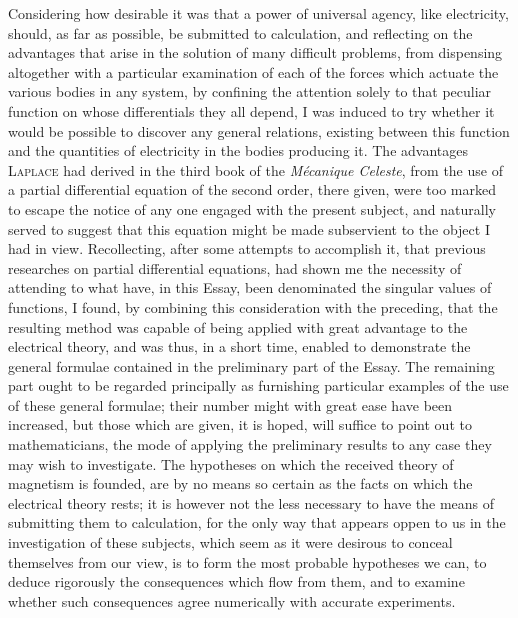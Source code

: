 \documentclass[11pt,notitlepage]{amsart}
\let\Person\textsc
\let\Title\textit
\begin{document}
Considering how desirable it was that a power of universal agency, like
electricity, should, as far as possible,
be submitted to calculation, and reflecting
on the advantages that arise in the solution of many difficult problems, from
dispensing altogether with a particular examination of each of the forces which
actuate the various bodies in any system, by confining the attention solely to
that peculiar function on whose differentials they all depend, I was induced to
try whether it would be possible to discover any general relations, existing
between this function and the quantities of electricity
in the bodies producing it.
The advantages \Person{Laplace} had derived in the
third book of the \Title{M\'ecanique Celeste},
from the use of a partial differential equation
of the second order, there given,
were too marked to escape the notice of any one engaged with the present
subject, and naturally served to suggest that this equation might be made 
subservient to the object I had in view. Recollecting, after some attempts to
accomplish it, that previous researches on partial differential equations, had
shown me the necessity of attending to what have, in this Essay, been 
denominated the singular values of functions, I found, by combining this 
consideration with the preceding, that the resulting method was capable of being
applied with great advantage to the electrical theory, and was thus, in a short
time, enabled to demonstrate the general formulae contained in the preliminary
part of the Essay. The remaining part ought to be regarded principally as 
furnishing particular examples of the use of
these general formulae; their number
might with great ease have been increased, but those which are given, it is
hoped, will suffice to point out to mathematicians, the mode of applying the
preliminary results to any case they may wish to investigate. The hypotheses
on which the received theory of magnetism is founded, are by no means so
certain as the facts on which the electrical theory rests; it is however not
the less necessary to have the means of submitting them to calculation, for
the only way that appears oppen to us in the investigation of these subjects,
which seem as it were desirous to conceal themselves from our view, is to
form the most probable hypotheses we can, to deduce rigorously the consequences
which flow from them, and to examine whether such consequences
agree numerically with accurate experiments.
\end{document}
